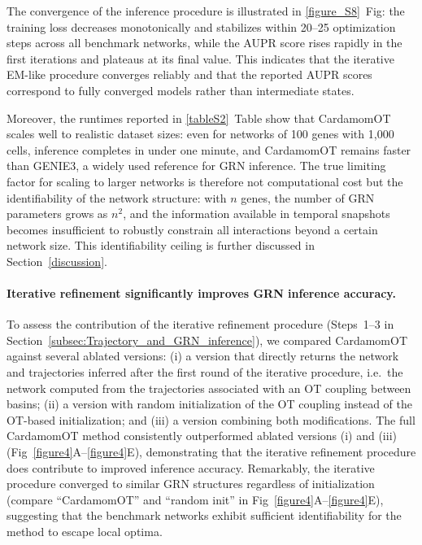 \documentclass[a4paper, 11pt]{article}
\theoremstyle{plain}
\theoremstyle{remark}
\newcommand*{\firstreview}[1]{{\color{black}#1}}
\begin{document}
The convergence of the inference procedure is illustrated in \ref{figure_S8}~Fig: 
the training loss decreases monotonically and stabilizes within 20--25 optimization 
steps across all benchmark networks, while the AUPR score rises rapidly in the first 
iterations and plateaus at its final value. This indicates that the iterative EM-like 
procedure converges reliably and that the reported AUPR scores correspond to 
fully converged models rather than intermediate states.

Moreover, the runtimes reported in \ref{tableS2}~Table show that CardamomOT scales 
well to realistic dataset sizes: even for networks of 100 genes with 1{,}000 cells, inference 
completes in under one minute, and CardamomOT remains faster than GENIE3, 
a widely used reference for GRN inference. The true limiting factor for 
scaling to larger networks is therefore not computational cost but the 
identifiability of the network structure: with $n$ genes, the number of 
GRN parameters grows as $n^2$, and the information available in temporal 
snapshots becomes insufficient to robustly constrain all interactions beyond 
a certain network size. This identifiability ceiling is further discussed in 
Section~\ref{discussion}.

\paragraph{Iterative refinement significantly improves GRN inference accuracy.}
To assess the contribution of the iterative refinement procedure (Steps~1--3 in Section~\ref{subsec:Trajectory_and_GRN_inference}), we compared CardamomOT against several ablated versions: (i) a version that directly returns the network and trajectories inferred after the first round of the iterative procedure, i.e.\ the network computed from the trajectories associated with an OT coupling between basins; (ii) a version with random initialization of the OT coupling instead of the \firstreview{OT}-based initialization; and (iii) a version combining both modifications. The full CardamomOT method consistently outperformed ablated versions (i) and (iii) (Fig~\ref{figure4}A--\ref{figure4}E), demonstrating that the iterative refinement procedure does contribute to improved inference accuracy. Remarkably, the iterative procedure converged to similar GRN structures regardless of initialization (compare “CardamomOT” and “random init” in Fig~\ref{figure4}A--\ref{figure4}E), suggesting that the benchmark networks exhibit sufficient identifiability for the method to escape local optima.
\end{document}
